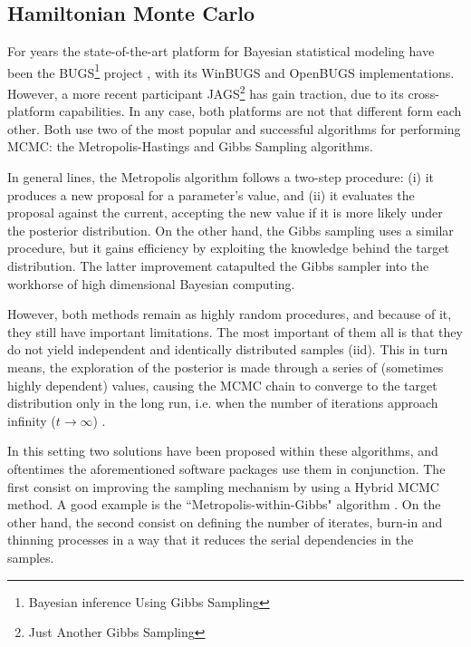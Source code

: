 \subsection{Hamiltonian Monte Carlo}

For years the state-of-the-art platform for Bayesian statistical modeling have been the BUGS\footnote{Bayesian inference Using Gibbs Sampling} project \cite{Lunn_et_al_2000, Lunn_et_al_2009}, with its WinBUGS and OpenBUGS implementations. However, a more recent participant JAGS\footnote{Just Another Gibbs Sampling} \cite{Plummer_2003} has gain traction, due to its cross-platform capabilities. In any case, both platforms are not that different form each other. Both use two of the most popular and successful algorithms for performing MCMC: the Metropolis-Hastings \cite{Metropolis_et_al_1953, Hastings_1970} and Gibbs Sampling \cite{Geman_et_al_1984} algorithms.

In general lines, the Metropolis algorithm follows a two-step procedure: (i) it produces a new proposal for a parameter's value, and (ii) it evaluates the proposal against the current, accepting the new value if it is more likely under the posterior distribution. On the other hand, the Gibbs sampling uses a similar procedure, but it gains efficiency by exploiting the knowledge behind the target distribution. The latter improvement catapulted the Gibbs sampler into the workhorse of high dimensional Bayesian computing. 

However, both methods remain as highly random procedures, and because of it, they still have important limitations. The most important of them all is that they do not yield independent and identically distributed samples (iid). This in turn means, the exploration of the posterior is made through a series of (sometimes highly dependent) values, causing the MCMC chain to converge to the target distribution only in the long run, i.e. when the number of iterations approach infinity ($t \rightarrow \infty$) \cite{Gelman_et_al_2014}. 

In this setting two solutions have been proposed within these algorithms, and oftentimes the aforementioned software packages use them in conjunction. The first consist on  improving the sampling mechanism by using a Hybrid MCMC method. A good example is the ``Metropolis-within-Gibbs" algorithm \cite{Muller_1991}. On the other hand, the second consist on defining the number of iterates, burn-in and thinning processes in a way that it reduces the serial dependencies in the samples.

